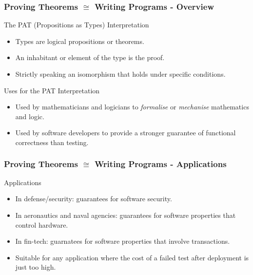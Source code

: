\documentclass
  [hyperref={colorlinks = true,linkcolor = blue, 
             citecolor = blue, urlcolor = blue}
  ]{beamer}
\begin{document}
\begin{frame}[fragile]
  \frametitle{Proving Theorems $\cong$ Writing Programs - Overview}
  \begin{block}{The PAT (Propositions as Types) Interpretation}
    \begin{itemize}
      \item Types are logical propositions or theorems.
      \item An inhabitant or element of the type is the proof.
      \item Strictly speaking an isomorphism that holds under specific
      conditions.
    \end{itemize}
  \end{block}
  \begin{block}{Uses for the PAT Interpretation}
    \begin{itemize}
      \item Used by mathematicians and logicians to \textit{formalise} or
            \textit{mechanise} mathematics and logic.
      \item Used by software developers to provide a stronger guarantee of
            functional correctness than testing.
    \end{itemize}
  \end{block}
\end{frame}

\begin{frame}[fragile]
  \frametitle{Proving Theorems $\cong$ Writing Programs - Applications}
  \begin{block}{Applications}
    \begin{itemize}
      \item In defense/security: guarantees for software security.
      \item In aeronautics and naval agencies: guarantees for software
      properties that control hardware.
      \item In fin-tech: guarnatees for software properties that involve
      transactions.
      \item Suitable for any application where the cost of a failed test
            after deployment is just too high.
    \end{itemize}
  \end{block}

\end{frame}
\end{document}

